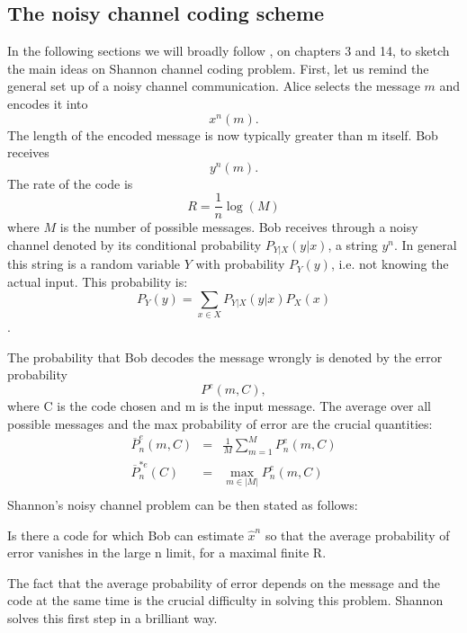 \subsection{The noisy channel coding scheme}
In the following sections we will broadly follow \cite{wilde_2013}, on chapters 3 and 14, to sketch the main ideas on Shannon channel coding problem. 
First, let us remind the general set up of a noisy channel communication. Alice selects the message $m$ and encodes it into $$x^n(m).$$ 
The length of the encoded message is now typically greater than m itself. Bob receives $$y^n(m).$$
The rate of the code is
$$R = \frac{1}{n}\log(M)$$
where $M$ is the number of possible messages. Bob receives through a noisy channel denoted by its conditional probability $P_{Y|X}(y|x)$, a string $y^n$. In general this string is a random variable $Y$ with probability $P_Y(y)$, i.e. not knowing the actual input. This probability is: $$P_Y(y) = \sum_{x \in X}P_{Y|X}(y|x)P_X(x)$$.

The probability that Bob decodes the message wrongly is denoted by the error probability 
\begin{equation}
P^e(m, C),
\end{equation}
where C is the code chosen and m is the input message. The average over all possible messages and the max probability of error are the crucial quantities:
\begin{eqnarray}
\overline{P}^{e}_n(m, C) &=& \frac{1}{M}\sum_{m=1}^{M}P^e_n(m,C) \\
\overline{P}^{*e}_n(C) &=& \underset{m \in |M|}{\max}P^e_n(m,C) \\
\end{eqnarray} 
Shannon's noisy channel problem can be then stated as follows:
\begin{info}
	Is there a code for which Bob can estimate $\hat{x}^n$ so that the average probability of error vanishes in the large n limit, for a maximal finite R. 
\end{info}
The fact that the average probability of error depends on the message and the code at the same time is the crucial difficulty in solving this problem.
Shannon solves this first step in a brilliant way.
